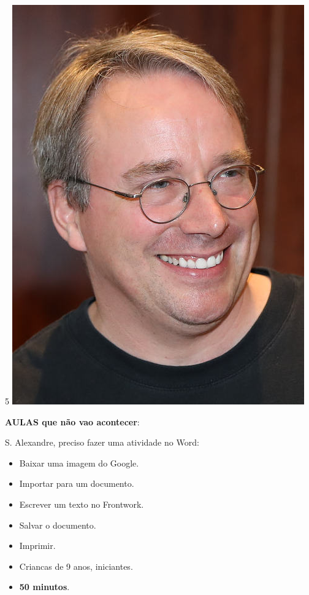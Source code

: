 \begin{multicols}{2}
	\begin{center}5
		\includegraphics[height=.8\textheight]{./IMG-GIT/linus.jpeg}
	\end{center}
	
	\columnbreak
	\Large \textbf{AULAS que não vao acontecer}:
	
	\vspace*{5mm}
	
	\Large S. Alexandre, preciso fazer uma \nobreak atividade no Word:
	
	\large
	\begin{itemize}
		\item Baixar uma imagem do Google.
		\item Importar para um documento.
		\item Escrever um texto no Frontwork.
		\item Salvar o documento.
		\item Imprimir.
		\item Criancas de 9 anos, iniciantes.
		\item \textbf{50 minutos}.
	\end{itemize}
	

\end{multicols}
